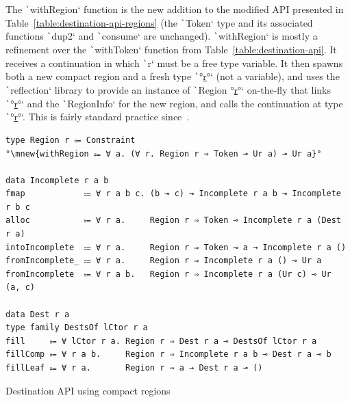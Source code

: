 \documentclass[english]{jflart}
\def\figscale{1.145}
\newcommand{\mnew}[1]{\colorbox{green!50}{#1}}
\newcommand{\muline}[1]{\uline{#1}}
\begin{document}
The \texttt`withRegion` function is the new addition to the modified API presented in Table~\ref{table:destination-api-regions} (the \texttt`Token` type and its associated functions \texttt`dup2` and \texttt`consume` are unchanged). \texttt`withRegion` is mostly a refinement over the \texttt`withToken` function from Table~\ref{table:destination-api}. It receives a continuation in which \texttt`r` must be a free type variable. It then spawns both a new compact region and a fresh type \texttt`°\muline{r}°` (not a variable), and uses the \texttt`reflection` library to provide an instance of \texttt`Region °\muline{r}°` on-the-fly that links \texttt`°\muline{r}°` and the \texttt`RegionInfo` for the new region, and calls the continuation at type \texttt`°\muline{r}°`. This is fairly standard practice since~\cite{launchbury_lazy_1994}.

\begin{table}[t]
\small
\begin{verbatim}
type Region r ⩴ Constraint
°\mnew{withRegion ⩴ ∀ a. (∀ r. Region r ⇒ Token ⊸ Ur a) ⊸ Ur a}°

data Incomplete r a b
fmap            ⩴ ∀ r a b c. (b ⊸ c) ⊸ Incomplete r a b ⊸ Incomplete r b c
alloc           ⩴ ∀ r a.     Region r ⇒ Token ⊸ Incomplete r a (Dest r a)
intoIncomplete  ⩴ ∀ r a.     Region r ⇒ Token ⊸ a → Incomplete r a ()
fromIncomplete_ ⩴ ∀ r a.     Region r ⇒ Incomplete r a () ⊸ Ur a
fromIncomplete  ⩴ ∀ r a b.   Region r ⇒ Incomplete r a (Ur c) ⊸ Ur (a, c)

data Dest r a
type family DestsOf lCtor r a
fill     ⩴ ∀ lCtor r a. Region r ⇒ Dest r a ⊸ DestsOf lCtor r a
fillComp ⩴ ∀ r a b.     Region r ⇒ Incomplete r a b ⊸ Dest r a ⊸ b
fillLeaf ⩴ ∀ r a.       Region r ⇒ a → Dest r a ⊸ ()
\end{verbatim}
\caption{Destination API using compact regions}
\label{table:destination-api-regions}

\medskip

\centering
  \scalebox{\figscale}{\tikzfig{alloc-region}}
  \label{fig:schema-alloc-region}
\end{table}
\end{document}

